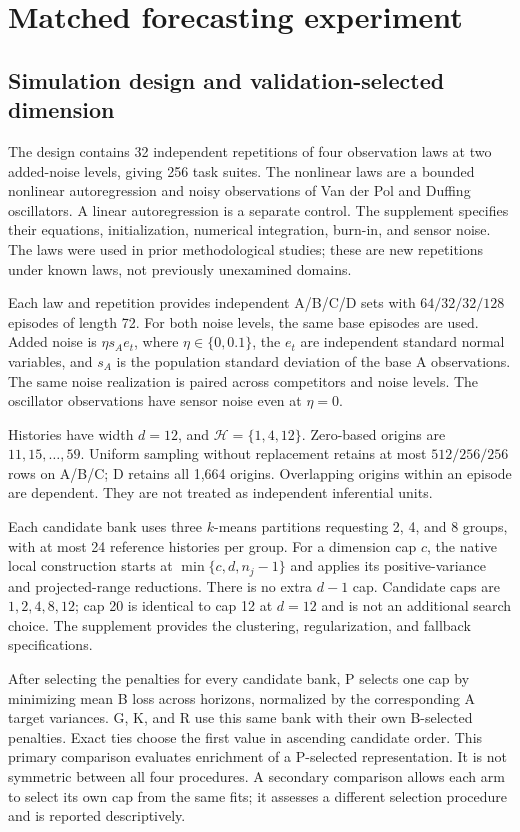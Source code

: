 
\section{Matched forecasting experiment}\label{sec:experiment}
\subsection{Simulation design and validation-selected dimension}
The design contains 32 independent repetitions of four observation laws at two added-noise levels, giving 256 task suites. The nonlinear laws are a bounded nonlinear autoregression and noisy observations of Van der Pol and Duffing oscillators. A linear autoregression is a separate control. The supplement specifies their equations, initialization, numerical integration, burn-in, and sensor noise. The laws were used in prior methodological studies; these are new repetitions under known laws, not previously unexamined domains.

Each law and repetition provides independent A/B/C/D sets with $64/32/32/128$ episodes of length 72. For both noise levels, the same base episodes are used. Added noise is $\eta s_A e_t$, where $\eta\in\{0,0.1\}$, the $e_t$ are independent standard normal variables, and $s_A$ is the population standard deviation of the base A observations. The same noise realization is paired across competitors and noise levels. The oscillator observations have sensor noise even at $\eta=0$.

Histories have width $d=12$, and $\mathcal H=\{1,4,12\}$. Zero-based origins are $11,15,\ldots,59$. Uniform sampling without replacement retains at most $512/256/256$ rows on A/B/C; D retains all 1,664 origins. Overlapping origins within an episode are dependent. They are not treated as independent inferential units.

Each candidate bank uses three $k$-means partitions requesting 2, 4, and 8 groups, with at most 24 reference histories per group. For a dimension cap $c$, the native local construction starts at $\min\{c,d,n_j-1\}$ and applies its positive-variance and projected-range reductions. There is no extra $d-1$ cap. Candidate caps are $1,2,4,8,12$; cap 20 is identical to cap 12 at $d=12$ and is not an additional search choice. The supplement provides the clustering, regularization, and fallback specifications.

After selecting the penalties for every candidate bank, P selects one cap by minimizing mean B loss across horizons, normalized by the corresponding A target variances. G, K, and R use this same bank with their own B-selected penalties. Exact ties choose the first value in ascending candidate order. This primary comparison evaluates enrichment of a P-selected representation. It is not symmetric between all four procedures. A secondary comparison allows each arm to select its own cap from the same fits; it assesses a different selection procedure and is reported descriptively.

